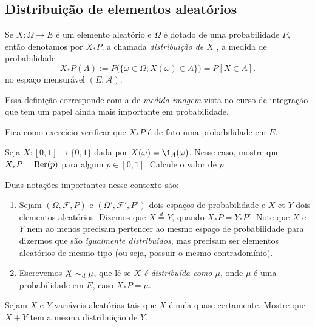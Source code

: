 \documentclass[../main/Notas_de_aula.tex]{subfiles}
\begin{document}
\subsection{Distribuição de elementos aleatórios}

\begin{definition}
  Se $X:\Omega \to E$ é um elemento aleatório e $\Omega$ é dotado de uma probabilidade $P$, então denotamos por $X_{*}P$,
  a chamada \emph{distribuição de $X$} , a medida de probabilidade
  \begin{equation}
    X_* P(A) := P\big( \{\omega \in \Omega; X(\omega) \in A\} \big) = P[X \in A].
  \end{equation}
  no espaço mensurável $(E,\mathcal{A})$.
\end{definition}

\begin{remark}
 Essa definição corresponde com a de \textit{medida imagem} vista no curso de integração que tem um papel ainda mais importante em probabilidade.
 \end{remark}



Fica como exercício verificar que $X_*P$ é de fato uma probabilidade em $E$.

\begin{exercise}
  Seja $X:[0,1] \to \{0,1\}$ dada por $X(\omega) = \1_A (\omega)$.
  Nesse caso, mostre que $X_*P = \operatorname{Ber}(p)$ para algum $p \in [0,1]$.
  Calcule o valor de $p$.
\end{exercise}

Duas notações importantes nesse contexto são:
\begin{enumerate}[\quad a)]
\item Sejam $(\Omega, \mathcal{F}, P)$ e $(\Omega',\mathcal{F}',P')$ dois espaços de probabilidade e $X$ et $Y$ dois elementos aleatórios.
Dizemos que $X \stackrel{d}{=} Y$,  quando $X_*P = Y_*P'$.
Note que $X$ e $Y$ nem ao menos precisam pertencer ao mesmo espaço de probabilidade para dizermos que são \emph{igualmente distribuídos}, mas precisam ser elementos aleatórios de mesmo tipo (ou seja, possuir o mesmo contradomínio).
\item Escrevemos $X \sim_d \mu$,  que lê-se \emph{$X$ é distribuída como $\mu$}, onde $\mu$ é uma probabilidade em $E$, caso $X_*P = \mu$.
\end{enumerate}

\begin{exercise}
  Sejam $X$ e $Y$ variáveis aleatórias tais que $X$ é nula quase certamente.
  Mostre que $X + Y$ tem a mesma distribuição de $Y$.
\end{exercise}
\end{document}

